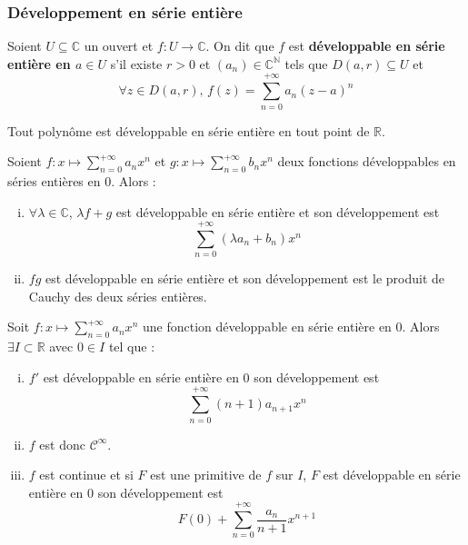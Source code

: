 	\subsubsection{Développement en série entière}


	\begin{definition}
		Soient $U \subseteq \mathbb{C}$ un ouvert et $f : U \rightarrow \mathbb{C}$. On dit que $f$ est \textbf{développable en série entière en $a \in U$} s'il existe $r > 0$ et $(a_n) \in \mathbb{C}^{\mathbb{N}}$ tels que $D(a, r) \subseteq U$ et
		\[ \forall z \in D(a, r), \, f(z) = \sum_{n=0}^{+\infty} a_n (z-a)^n \]
	\end{definition}


	\begin{example}
		Tout polynôme est développable en série entière en tout point de $\mathbb{R}$.
	\end{example}

	\begin{proposition}
		Soient $f : x \mapsto \sum_{n=0}^{+\infty} a_n x^n$ et $g : x \mapsto \sum_{n=0}^{+\infty} b_n x^n$ deux fonctions développables en séries entières en $0$. Alors :
		\begin{enumerate}[(i)]
			\item $\forall \lambda \in \mathbb{C}$, $\lambda f + g$ est développable en série entière et son développement est
			\[ \sum_{n=0}^{+\infty} (\lambda a_n + b_n) x^n \]
			\item $fg$ est développable en série entière et son développement est le produit de Cauchy des deux séries entières.
		\end{enumerate}
	\end{proposition}

	\begin{proposition}
		Soit $f : x \mapsto \sum_{n=0}^{+\infty} a_n x^n$ une fonction développable en série entière en $0$. Alors $\exists I \subset \mathbb{R}$ avec $0 \in I$ tel que :
		\begin{enumerate}[(i)]
			\item $f'$ est développable en série entière en $0$ son développement est
			\[ \sum_{n=0}^{+\infty} (n+1) a_{n+1} x^n \]
			\item $f$ est donc $\mathcal{C}^\infty$.
			\item $f$ est continue et si $F$ est une primitive de $f$ sur $I$, $F$ est développable en série entière en $0$ son développement est
			\[ F(0) + \sum_{n=0}^{+\infty} \frac{a_n}{n+1} x^{n+1} \]
		\end{enumerate}
	\end{proposition}

